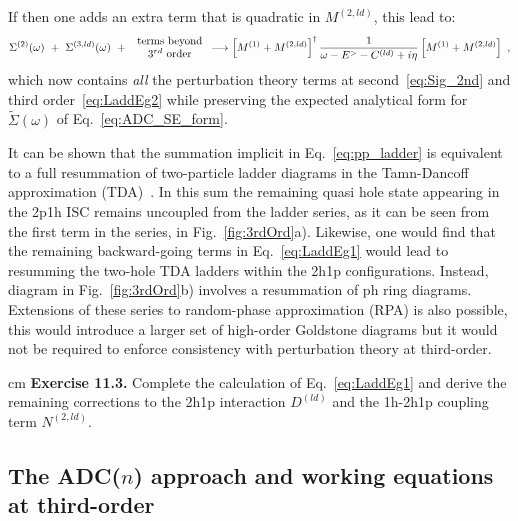 If then one adds an extra term that is quadratic in  $M^{(2,ld)}$, this lead to:
\begin{equation}
  \Sigma^{(2)}(\omega)  ~+~ \Sigma^{(3, ld)}(\omega) ~+~ \begin{array}{c} \hbox{terms beyond} \\ \hbox{ 3$^{rd}$ order } \end{array} 
 \longrightarrow  \left[ M^{(1)} +  M^{(2,ld)}\right]^\dagger \frac1{\omega  - E^> - C^{(ld)} + i\eta}\left[ M^{(1)} + M^{(2,ld)}\right]  \ ,
 \label{eq:pp_ladder}
\end{equation}
which now contains {\em all}  the perturbation theory terms at second~\eqref{eq:Sig_2nd} and third order~\eqref{eq:LaddEg2} while preserving the expected analytical form for~$\widetilde\Sigma(\omega)$ of Eq.~\eqref{eq:ADC_SE_form}.

It can be shown that the summation implicit in Eq.~\eqref{eq:pp_ladder} is equivalent to a full resummation of two-particle ladder diagrams in the Tamn-Dancoff approximation (TDA)~\cite{ch11_RingSchuck}. In this sum the remaining quasi hole state appearing in the 2p1h ISC remains uncoupled from the ladder series, as it can be seen from the first term in the series, in Fig.~\ref{fig:3rdOrd}a).  Likewise, one would find that the remaining backward-going terms in Eq.~\eqref{eq:LaddEg1} would lead to resumming the two-hole TDA ladders within the 2h1p configurations. Instead, diagram in Fig.~\ref{fig:3rdOrd}b) involves a resummation of ph ring diagrams. Extensions of these series to random-phase approximation (RPA) is also possible, this would introduce a larger set of high-order Goldstone diagrams but it would not be required to enforce consistency with perturbation theory at third-order.

 cm
\noindent
{\bf Exercise 11.3.}  Complete  the calculation of Eq.~\eqref{eq:LaddEg1} and derive the remaining corrections to the 2h1p interaction $D^{(ld)}$  and the 1h-2h1p coupling term  $N^{(2,ld)}$.


\subsection{The ADC($n$) approach and working equations at third-order}

